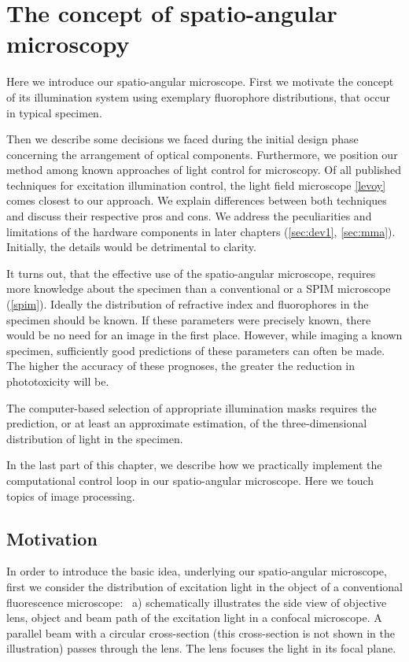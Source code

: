 \chapter{The concept of spatio-angular microscopy}
\label{sec:concept}
\begin{summary}
  Here we introduce our spatio-angular microscope. First we motivate
  the concept of its illumination system using exemplary fluorophore
  distributions, that occur in typical specimen.

  Then we describe some decisions we faced during the initial design
  phase concerning the arrangement of optical components. Furthermore,
  we position our method among known approaches of light control for
  microscopy. Of all published techniques for excitation illumination
  control, the light field microscope \ref{levoy} comes closest to our
  approach.  We explain differences between both techniques and
  discuss their respective pros and cons.  We address the
  peculiarities and limitations of the hardware components in later
  chapters (\ref{sec:dev1}, \ref{sec:mma}).  Initially, the details
  would be detrimental to clarity.

  It turns out, that the effective use of the spatio-angular
  microscope, requires more knowledge about the specimen than a
  conventional or a SPIM microscope (\ref{spim}). Ideally the
  distribution of refractive index and fluorophores in the specimen
  should be known. If these parameters were precisely known, there
  would be no need for an image in the first place. However, while
  imaging a known specimen, sufficiently good predictions of these
  parameters can often be made. The higher the accuracy of these
  prognoses, the greater the reduction in phototoxicity will be.

  The computer-based selection of appropriate illumination masks
  requires the prediction, or at least an approximate estimation, of
  the three-dimensional distribution of light in the specimen.

  In the last part of this chapter, we describe how we practically
  implement the computational control loop in our spatio-angular
  microscope. Here we touch topics of image processing.
\end{summary}
\section{Motivation}
In order to introduce the basic idea, underlying our spatio-angular
microscope, first we consider the distribution of excitation light in
the object of a conventional fluorescence microscope:
~a) schematically illustrates the side view
of objective lens, object and beam path of the excitation light in a
confocal microscope. A parallel beam with a circular cross-section
(this cross-section is not shown in the illustration) passes through
the lens. The lens focuses the light in its focal plane.

